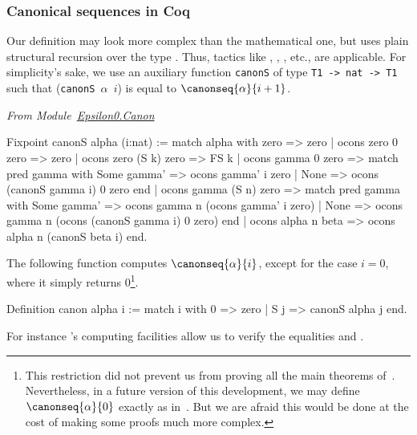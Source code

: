 \subsubsection{Canonical sequences in Coq}

Our definition may look more complex than the mathematical one, but
uses plain structural recursion over the type . Thus, tactics like
, , , etc., are applicable. For simplicity's sake, 
we use an auxiliary function \texttt{canonS} of type \texttt{T1 -> nat  -> T1} such that
(\texttt{canonS  $\alpha$ $i$}) is equal to $\canonseq{\alpha}{i+1}$.

\vspace{4pt}
\emph{From Module~\href{../theories/html/hydras.Epsilon0.Canon.html\#canonS}{Epsilon0.Canon}}

\label{Functions:canonS}
\label{Functions:canon}
\begin{Coqsrc}
Fixpoint canonS alpha (i:nat) :=
  match alpha with
      zero => zero
    | ocons zero 0 zero => zero
    | ocons zero (S k) zero => FS k
    | ocons gamma 0 zero =>
      match pred gamma with
          Some gamma' => ocons gamma' i zero
        | None => ocons (canonS gamma i) 0 zero
      end
    | ocons gamma (S n) zero =>
       match pred gamma with
           Some gamma' => ocons gamma n (ocons gamma' i zero)
         | None => ocons gamma n (ocons (canonS gamma i) 0 zero)
       end
    | ocons alpha n beta => ocons alpha n (canonS beta i)
  end.
\end{Coqsrc}


The following function computes $\canonseq{\alpha}{i}$, except for the case $i=0$, where it simply returns $0$\;\footnote{This restriction did not prevent us from proving all the main theorems of~\cite{KS81, KP82}. Nevertheless, in a future version of this development, we may define $\canonseq{\alpha}{0}$ exactly as 
in~\cite{KS81}. But we are afraid this would  be done at the cost of making some proofs much more complex.}.

\begin{Coqsrc}
 Definition canon alpha i := 
   match i with 0 => zero | S j => canonS alpha j end. 
\end{Coqsrc}

For instance \coq's computing facilities allow us to verify the equalities\linebreak 
{} and
.


